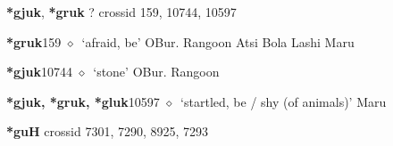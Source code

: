 \item
\textbf{*gjuk}, \textbf{*gruk}
?
  {\tiny crossid 159, 10744, 10597}
  \begin{list}{}{\leftmargin=1.5em \itemindent=-1.5em}
  \item {\footnotesize \textbf{*gruk}}{\tiny 159}
         $\diamond$~`afraid, be'
         OBur. 
\hspace{1ex}
         Rangoon 
\hspace{1ex}
         Atsi 
\hspace{1ex}
         Bola 
\hspace{1ex}
         Lashi 
\hspace{1ex}
         Maru 
  \item {\footnotesize \textbf{*gjuk}}{\tiny 10744}
\hspace{1ex}
         $\diamond$~`stone'
         OBur. 
\hspace{1ex}
         Rangoon 
  \item {\footnotesize \textbf{*gjuk, *gruk, *gluk}}{\tiny 10597}
\hspace{1ex}
         $\diamond$~`startled, be / shy (of animals)'
         Maru 
  \end{list}
\item
\textbf{*guH}
  {\tiny crossid 7301, 7290, 8925, 7293}
